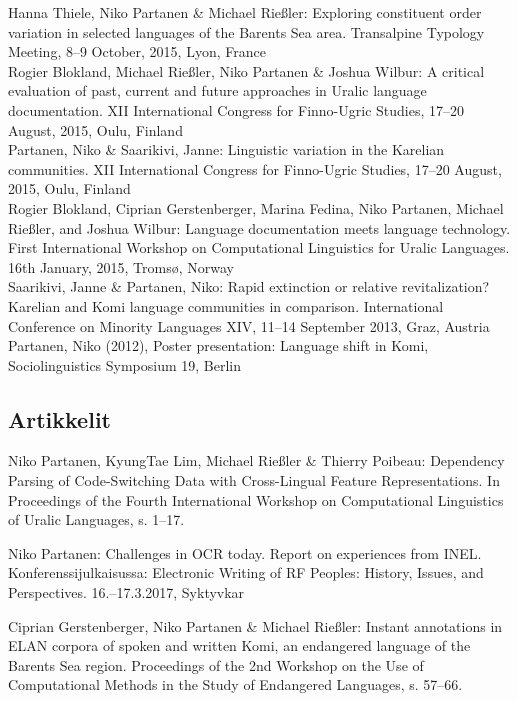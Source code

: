 \documentclass[11pt, a4paper]{article}
\newcommand{\years}[1]{\marginnote{\scriptsize #1}} %
\begin{document}
\years{2015} Hanna Thiele, Niko Partanen \& Michael Rießler: Exploring constituent order variation in selected languages of the Barents Sea area. Transalpine Typology Meeting, 8–9 October, 2015, Lyon, France\\

\years{2015} Rogier Blokland, Michael Rießler, Niko Partanen \& Joshua Wilbur: A critical evaluation of past, current and future approaches in Uralic language documentation. XII International Congress for Finno-Ugric Studies, 17–20 August, 2015, Oulu, Finland\\

\years{2015} Partanen, Niko \& Saarikivi, Janne: Linguistic variation in the Karelian communities. XII International Congress for Finno-Ugric Studies, 17–20 August, 2015, Oulu, Finland\\

\years{2014} Rogier Blokland, Ciprian Gerstenberger, Marina Fedina, Niko Partanen, Michael Rießler, and Joshua Wilbur: Language documentation meets language technology. First International Workshop on Computational Linguistics for Uralic Languages. 16th January, 2015, Tromsø, Norway\\

\years{2013} Saarikivi, Janne \& Partanen, Niko: Rapid extinction or relative revitalization? Karelian and Komi language communities in comparison. International Conference on Minority Languages XIV, 11–14 September 2013, Graz, Austria\\ 

\years{2012}Partanen, Niko (2012), Poster presentation: Language shift in Komi, Sociolinguistics Symposium 19, Berlin\\

\subsection*{Artikkelit}

\years{2018} Niko Partanen, KyungTae Lim, Michael Rießler \& Thierry Poibeau: Dependency Parsing of Code-Switching Data with Cross-Lingual Feature Representations. In Proceedings of the Fourth International Workshop on Computational Linguistics of Uralic Languages, s. 1--17.

\years{2017} Niko Partanen: Challenges in OCR today. Report on experiences from INEL. Konferenssijulkaisussa: Electronic Writing of RF Peoples: History, Issues, and Perspectives. 16.--17.3.2017, Syktyvkar

\years{2017} Ciprian Gerstenberger, Niko Partanen \& Michael Rießler: Instant annotations in ELAN corpora of spoken and written Komi, an endangered language of the Barents Sea region. Proceedings of the 2nd Workshop on the Use of Computational Methods in the Study of Endangered Languages, s. 57--66. 
\end{document}
